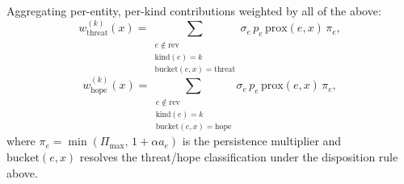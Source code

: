 \documentclass[11pt]{article}
\begin{document}
Aggregating per-entity, per-kind contributions weighted by all of
the above:
\begin{equation}
w^{(k)}_{\mathrm{threat}}(x) \!=\!\!\!\sum_{\substack{e \notin \mathrm{rev} \\ \mathrm{kind}(e)=k \\ \mathrm{bucket}(e,x)=\mathrm{threat}}}\!\!\! \sigma_e \, p_e \,\mathrm{prox}(e, x)\, \pi_e,
\end{equation}
\begin{equation}
w^{(k)}_{\mathrm{hope}}(x) \!=\!\!\!\sum_{\substack{e \notin \mathrm{rev} \\ \mathrm{kind}(e)=k \\ \mathrm{bucket}(e,x)=\mathrm{hope}}}\!\!\! \sigma_e \, p_e \,\mathrm{prox}(e, x)\, \pi_e,
\end{equation}
where $\pi_e = \min(\Pi_{\max},\, 1 + \alpha a_e)$ is the
persistence multiplier and $\mathrm{bucket}(e, x)$ resolves the
threat/hope classification under the disposition rule above.
\end{document}
